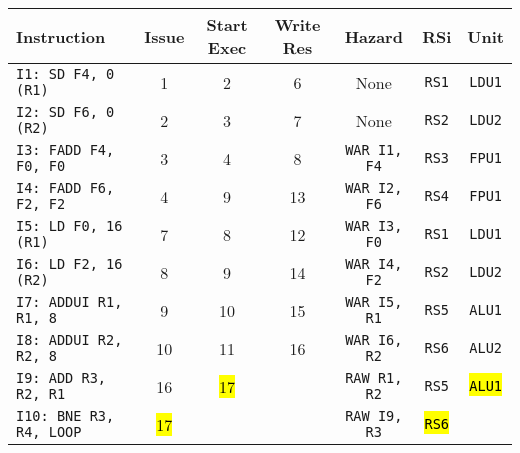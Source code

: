 \begin{enumerate}
    \begin{table}[!htp]
        \centering
        \begin{adjustbox}{width={\textwidth},totalheight={\textheight},keepaspectratio}
        \begin{tabular}{@{} l c c c c c c @{}}
            \toprule
            \textbf{Instruction} & \textbf{Issue} & \textbf{Start Exec} & \textbf{Write Res} & \textbf{Hazard} & \textbf{RSi} & \textbf{Unit} \\
            \midrule
            \texttt{I1: SD F4, 0 (R1)}      & 1 & 2 & 6 & None  & \texttt{RS1}   & \texttt{LDU1}  \\ [.5em]
            \texttt{I2: SD F6, 0 (R2)}      & 2 & 3 & 7 & None  & \texttt{RS2}   & \texttt{LDU2}  \\ [.5em]
            \texttt{I3: FADD F4, F0, F0}    & 3 & 4 & 8 & \texttt{WAR I1, F4}  & \texttt{RS3} & \texttt{FPU1} \\ [.5em]
            \texttt{I4: FADD F6, F2, F2}    & 4 & 9 & 13 & \texttt{WAR I2, F6} & \texttt{RS4} & \texttt{FPU1} \\ [.5em]
            \texttt{I5: LD F0, 16 (R1)}     & 7 & 8 & 12 & \texttt{WAR I3, F0} & \texttt{RS1} & \texttt{LDU1} \\ [.5em]
            \texttt{I6: LD F2, 16 (R2)}     & 8 & 9 & 14 & \texttt{WAR I4, F2} & \texttt{RS2} & \texttt{LDU2} \\ [.5em]
            \texttt{I7: ADDUI R1, R1, 8}    & 9 & 10 & 15 & \texttt{WAR I5, R1} & \texttt{RS5} & \texttt{ALU1} \\ [.5em]
            \texttt{I8: ADDUI R2, R2, 8}    & 10 & 11 & 16 & \texttt{WAR I6, R2} & \texttt{RS6} & \texttt{ALU2} \\ [.5em]
            \texttt{I9: ADD R3, R2, R1}     & 16 & \hl{17} &   & \texttt{RAW R1, R2} & \texttt{RS5} & \hl{\texttt{ALU1}} \\ [.5em]
            \texttt{I10: BNE R3, R4, LOOP}   & \hl{17} &   &   & \texttt{RAW I9, R3} & \hl{\texttt{RS6}} &       \\
            \bottomrule
        \end{tabular}
        \end{adjustbox}
    \end{table}
    

\end{enumerate}
